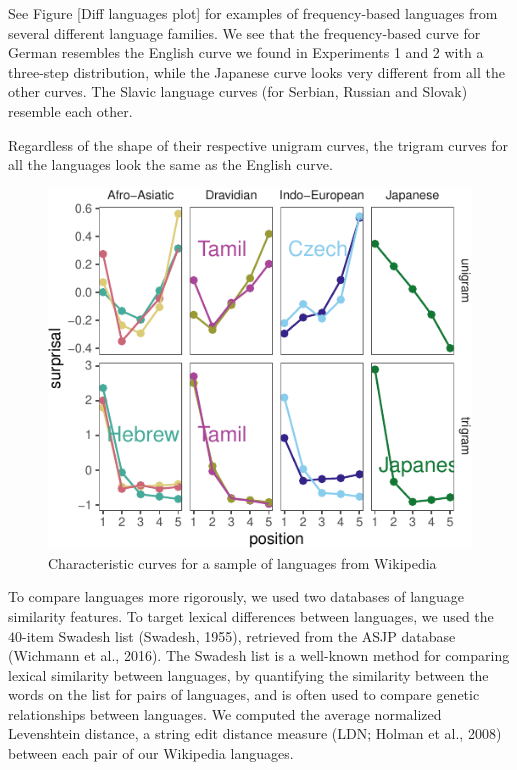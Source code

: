 \documentclass[10pt, letterpaper]{article}
\newenvironment{CodeChunk}{}{}
\begin{document}
See Figure {[}Diff languages plot{]} for examples of frequency-based
languages from several different language families. We see that the
frequency-based curve for German resembles the English curve we found in
Experiments 1 and 2 with a three-step distribution, while the Japanese
curve looks very different from all the other curves. The Slavic
language curves (for Serbian, Russian and Slovak) resemble each other.

Regardless of the shape of their respective unigram curves, the trigram
curves for all the languages look the same as the English curve.

\begin{CodeChunk}
\begin{figure}[tb]
\includegraphics{figs/diff-languages-plot-1} \caption[Characteristic curves for a sample of languages from Wikipedia]{Characteristic curves for a sample of languages from Wikipedia}\label{fig:diff-languages-plot}
\end{figure}
\end{CodeChunk}

To compare languages more rigorously, we used two databases of language
similarity features. To target lexical differences between languages, we
used the \(40\)-item Swadesh list (Swadesh, 1955), retrieved from the
ASJP database (Wichmann et al., 2016). The Swadesh list is a well-known
method for comparing lexical similarity between languages, by
quantifying the similarity between the words on the list for pairs of
languages, and is often used to compare genetic relationships between
languages. We computed the average normalized Levenshtein distance, a
string edit distance measure (LDN; Holman et al., 2008) between each
pair of our Wikipedia languages.
\end{document}
